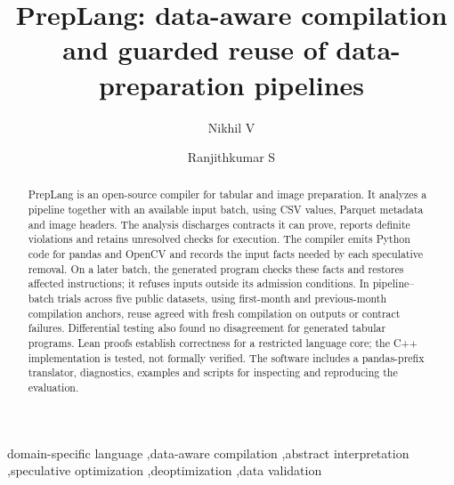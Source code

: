 \documentclass[preprint,12pt,a4paper]{elsarticle}  %
\newcommand{\PL}{PrepLang\xspace}
\begin{document}
\begin{frontmatter}

\title{PrepLang: data-aware compilation and guarded reuse of data-preparation pipelines}

\author[a]{Nikhil V}
\author[b]{Ranjithkumar S}
\address[a]{School of Computer Science and Engineering, Vellore Institute of Technology, Vellore 632014,
Tamil Nadu, India}
\address[b]{Department of Analytics, School of Computer Science and Engineering, Vellore Institute of
Technology, Vellore 632014, Tamil Nadu, India}

\begin{abstract}
\PL is an open-source compiler for tabular and image preparation. It analyzes a pipeline together with
an available input batch, using CSV values, Parquet metadata and image headers. The analysis discharges
contracts it can prove, reports definite violations and retains unresolved checks for execution. The
compiler emits Python code for pandas and OpenCV and records the input facts needed by each speculative
removal. On a later batch, the generated program checks these facts and restores affected instructions;
it refuses inputs outside its admission conditions. In \RealRuns{} pipeline--batch trials across five
public datasets, using first-month and previous-month compilation anchors, reuse agreed with fresh
compilation on outputs or contract failures. Differential testing also found no disagreement for
\DiffAll{} generated tabular programs. Lean proofs establish correctness for a restricted language core;
the C++ implementation is tested, not formally verified. The software includes a pandas-prefix translator,
diagnostics, examples and scripts for inspecting and reproducing the evaluation.
\end{abstract}

\begin{keyword}
domain-specific language \sep data-aware compilation \sep abstract interpretation \sep speculative
optimization \sep deoptimization \sep data validation
\end{keyword}

\end{frontmatter}

\end{document}
